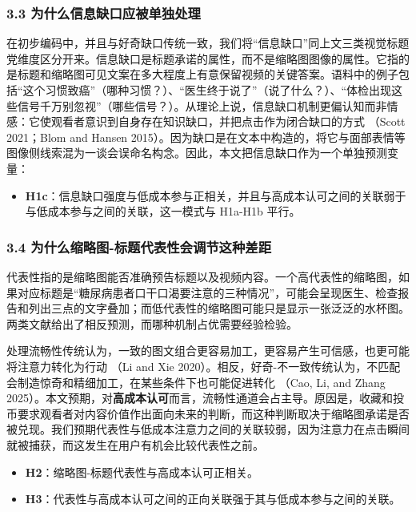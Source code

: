 \documentclass[
  fontset=none]{ctexart}
\providecommand{\tightlist}{%
  \setlength{\itemsep}{0pt}\setlength{\parskip}{0pt}}
\begin{document}
\subsubsection{3.3 为什么信息缺口应被单独处理}\label{ux4e3aux4ec0ux4e48ux4fe1ux606fux7f3aux53e3ux5e94ux88abux5355ux72ecux5904ux7406}

在初步编码中，并且与好奇缺口传统一致，我们将``信息缺口''同上文三类视觉标题党维度区分开来。信息缺口是标题承诺的属性，而不是缩略图图像的属性。它指的是标题和缩略图可见文案在多大程度上有意保留视频的关键答案。语料中的例子包括``这个习惯致癌''（哪种习惯？）、``医生终于说了''（说了什么？）、``体检出现这些信号千万别忽视''（哪些信号？）。从理论上说，信息缺口机制更偏认知而非情感：它使观看者意识到自身存在知识缺口，并把点击作为闭合缺口的方式 （Scott 2021；Blom and Hansen 2015）。因为缺口是在文本中构造的，将它与面部表情等图像侧线索混为一谈会误命名构念。因此，本文把信息缺口作为一个单独预测变量：

\begin{itemize}
\tightlist
\item
  \textbf{H1c}：信息缺口强度与低成本参与正相关，并且与高成本认可之间的关联弱于与低成本参与之间的关联，这一模式与 H1a-H1b 平行。
\end{itemize}

\subsubsection{3.4 为什么缩略图-标题代表性会调节这种差距}\label{ux4e3aux4ec0ux4e48ux7f29ux7565ux56fe-ux6807ux9898ux4ee3ux8868ux6027ux4f1aux8c03ux8282ux8fd9ux79cdux5deeux8ddd}

代表性指的是缩略图能否准确预告标题以及视频内容。一个高代表性的缩略图，如果对应标题是``糖尿病患者口干口渴要注意的三种情况''，可能会呈现医生、检查报告和列出三点的文字叠加；而低代表性的缩略图可能只是显示一张泛泛的水杯图。两类文献给出了相反预测，而哪种机制占优需要经验检验。

处理流畅性传统认为，一致的图文组合更容易加工，更容易产生可信感，也更可能将注意力转化为行动 （Li and Xie 2020）。相反，好奇-不一致传统认为，不匹配会制造惊奇和精细加工，在某些条件下也可能促进转化 （Cao, Li, and Zhang 2025）。本文预期，对\textbf{高成本认可}而言，流畅性通道会占主导。原因是，收藏和投币要求观看者对内容价值作出面向未来的判断，而这种判断取决于缩略图承诺是否被兑现。我们预期代表性与低成本注意力之间的关联较弱，因为注意力在点击瞬间就被捕获，而这发生在用户有机会比较代表性之前。

\begin{itemize}
\tightlist
\item
  \textbf{H2}：缩略图-标题代表性与高成本认可正相关。
\item
  \textbf{H3}：代表性与高成本认可之间的正向关联强于其与低成本参与之间的关联。
\end{itemize}
\end{document}
